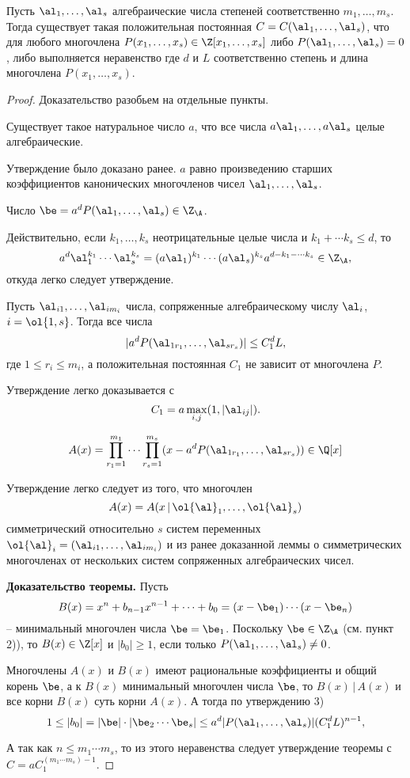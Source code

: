 \documentclass{article}
\begin{document}
\begin{theorem}
Пусть $\al_1, \dots, \al_s$ алгебраические числа степеней соответственно $m_1, \dots, m_s$.
Тогда существует такая положительная постоянная $C=C(\al_1, \dots, \al_s)$, что для любого многочлена
$P(x_1, \dots, x_s) \in \Z[x_1, \dots, x_s]$ либо
$P(\al_1, \dots, \al_s)=0$, либо выполняется неравенство
где $d$ и $L$ соответственно степень и длина многочлена $P(x_1, \dots, x_s)$.
\end{theorem}
\begin{proof}
Доказательство разобьем на отдельные пункты.

 Существует такое натуральное число $a$, что все числа $a \al_1, \dots, a \al_s$ целые алгебраические.

Утверждение было доказано ранее. $a$ равно произведению старших коэффициентов
канонических многочленов чисел $\al_1, \dots, \al_s$.

 Число $\be = a^d P(\al_1, \dots, \al_s) \in \Z_{\A}$.

Действительно, если $k_1, \dots, k_s$ неотрицательные целые числа и
$k_1+ \cdots k_s \le d$, то
$$
a^d \al_1^{k_1} \cdots \al_s^{k_s} = (a \al_1)^{k_1} \cdots
(a \al_s)^{k_s}a^{d-k_1- \cdots k_s} \in \Z_{\A},
$$
откуда легко следует утверждение.
\vskip 5mm

 Пусть $\al_{i1}, \dots, \al_{im_i}$ числа, сопряженные алгебраическому числу  $\al_i$, $i= \ol{1,s}$.
Тогда все числа
$$|a^dP(\al_{1r_1}, \dots, \al_{sr_s})| \le C_1^d L,$$
где $1 \le r_i \le m_i$, а положительная постоянная  $C_1$ не зависит от многочлена $P$.

Утверждение легко доказывается с
$$C_1= a \max_{i,j} (1, |\al_{ij}|).$$

$$
A(x)= \prod_{r_1=1}^{m_1} \cdots \prod_{r_s=1}^{m_s} (x-a^dP(\al_{1r_1}, \dots, \al_{sr_s})) \in \Q[x]
$$

Утверждение легко следует из того, что многочлен
$$A(x) = A(x \,| \, \ol {\al}_1, \dots, \ol {\al}_s)$$
симметрический относительно $s$  систем переменных
$\ol{\al}_i= (\al_{i1}, \dots, \al_{im_i})$ и из ранее доказанной
леммы о симметрических многочленах от нескольких систем сопряженных
алгебраических чисел.

\textbf{Доказательство теоремы.} Пусть
$$
B(x)= x^n+b_{n-1}x^{n-1}+ \cdots +b_0 = (x- \be_1) \cdots (x- \be_n)
$$
-- минимальный многочлен числа $\be = \be_1$. Поскольку
$\be \in \Z_{\A}$ (см. пункт 2)), то $B(x) \in \Z [x]$ и
$|b_0| \ge 1$, если только $P(\al_1, \dots, \al_s) \ne 0$.

Многочлены $A(x)$  и $B(x)$  имеют рациональные коэффициенты и
общий корень $\be$,  а к $B(x)$ минимальный многочлен числа
$\be$,    то $B(x) \,| \, A(x)$  и все корни $B(x)$  суть корни $A(x)$.
А тогда по утверждению 3)
$$
1 \le |b_0| = |\be| \cdot |\be_2 \cdots \be_s| \le
a^d|P(\al_1, \dots, \al_s)| ( C_1^d L)^{n-1},
$$

А так как $n \le m_1 \cdots m_s$, то из этого неравенства следует утверждение
теоремы с $C=a C_1^{(m_1 \cdots m_s)-1}$.
\end{proof}
\end{document}
